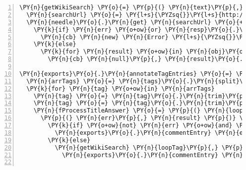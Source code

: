 \begin{Verbatim}[fontsize=\scriptsize,commandchars=\\\{\},numbers=left,firstnumber=1,stepnumber=1]
\PY{n}{getWikiSearch} \PY{o}{=} \PY{p}{(} \PY{n}{text}\PY{p}{,} \PY{n}{cb} \PY{p}{)} \PY{o}{\PYZhy{}}\PY{o}{\PYZgt{}}
  \PY{n}{searchUrl} \PY{o}{=} \PY{l+s}{\PYZsq{}}\PY{l+s}{http://en.wikipedia.org/w/api.php?format=json\PYZam{}action=query\PYZam{}list=search\PYZam{}srwhat=text\PYZam{}srlimit=3\PYZam{}srsearch=}\PY{l+s}{\PYZsq{}}
  \PY{n}{needle}\PY{o}{.}\PY{n}{get} \PY{n}{searchUrl} \PY{o}{+} \PY{n}{encodeURIComponent}\PY{p}{(} \PY{n}{text} \PY{p}{)}\PY{p}{,} \PY{p}{(} \PY{n}{err}\PY{p}{,} \PY{n}{resp}\PY{p}{,} \PY{n}{obj} \PY{p}{)} \PY{o}{\PYZhy{}}\PY{o}{\PYZgt{}}
    \PY{k}{if} \PY{n}{err} \PY{o+ow}{or} \PY{n}{resp}\PY{o}{.}\PY{n}{statusCode} \PY{n}{isnt} \PY{l+m+mi}{200} \PY{o+ow}{or} \PY{o+ow}{not} \PY{n}{obj}\PY{o}{.}\PY{n}{query} \PY{o+ow}{or} \PY{o+ow}{not} \PY{n}{obj}\PY{o}{.}\PY{n}{query}\PY{o}{.}\PY{n}{search} \PY{o+ow}{or} \PY{n}{obj}\PY{o}{.}\PY{n}{query}\PY{o}{.}\PY{n}{search}\PY{o}{.}\PY{n}{length} \PY{o+ow}{is} \PY{l+m+mi}{0}
      \PY{n}{cb} \PY{n}{new} \PY{n}{Error} \PY{l+s}{\PYZsq{}}\PY{l+s}{Nothing found}\PY{l+s}{\PYZsq{}}
    \PY{k}{else}
      \PY{k}{for} \PY{n}{result} \PY{o+ow}{in} \PY{n}{obj}\PY{o}{.}\PY{n}{query}\PY{o}{.}\PY{n}{search}
        \PY{n}{cb} \PY{n}{null}\PY{p}{,} \PY{n}{result}\PY{o}{.}\PY{n}{snippet}\PY{o}{.}\PY{n}{replace} \PY{o}{/}\PY{o}{\PYZlt{}}\PY{p}{(}\PY{err}{?}\PY{p}{:}\PY{o}{.}\PY{o}{|}\PYZbs{}\PY{n}{n}\PY{p}{)}\PY{o}{*}\PY{err}{?}\PY{o}{\PYZgt{}}\PY{o}{/}\PY{n}{gm}\PY{p}{,} \PY{l+s}{\PYZsq{}}\PY{l+s}{\PYZsq{}}

\PY{n}{exports}\PY{o}{.}\PY{n}{annotateTagEntries} \PY{o}{=} \PY{p}{(} \PY{n}{entryId}\PY{p}{,} \PY{n}{tags} \PY{p}{)} \PY{o}{\PYZhy{}}\PY{o}{\PYZgt{}}
  \PY{n}{arrTags} \PY{o}{=} \PY{n}{tags}\PY{o}{.}\PY{n}{split}\PY{p}{(} \PY{l+s}{\PYZdq{}}\PY{l+s}{\PYZsh{}}\PY{l+s}{\PYZdq{}} \PY{p}{)}\PY{o}{.}\PY{n}{slice} \PY{l+m+mi}{1}
  \PY{k}{for} \PY{n}{tag} \PY{o+ow}{in} \PY{n}{arrTags}
    \PY{n}{tag} \PY{o}{=} \PY{n}{tag}\PY{o}{.}\PY{n}{trim}\PY{p}{(}\PY{p}{)}\PY{o}{.}\PY{n}{replace} \PY{o}{/}\PYZbs{}\PYZbs{}\PY{l+s}{\PYZdq{}}\PY{l+s}{/g, }\PY{l+s}{\PYZsq{}}\PY{l+s}{\PYZsq{}}
    \PY{n}{tag} \PY{o}{=} \PY{n}{tag}\PY{o}{.}\PY{n}{trim}\PY{p}{(}\PY{p}{)}\PY{o}{.}\PY{n}{replace} \PY{o}{/}\PYZbs{}\PYZbs{}\PY{o}{/}\PY{n}{g}\PY{p}{,} \PY{l+s}{\PYZsq{}}\PY{l+s}{\PYZsq{}}
    \PY{n}{fProcessTitleAnswer} \PY{o}{=} \PY{p}{(} \PY{n}{loopTag} \PY{p}{)} \PY{o}{\PYZhy{}}\PY{o}{\PYZgt{}} 
      \PY{p}{(} \PY{n}{err}\PY{p}{,} \PY{n}{result} \PY{p}{)} \PY{o}{\PYZhy{}}\PY{o}{\PYZgt{}}
        \PY{k}{if} \PY{o+ow}{not} \PY{n}{err} \PY{o+ow}{and} \PY{n}{result}
          \PY{n}{exports}\PY{o}{.}\PY{n}{commentEntry} \PY{n}{entryId}\PY{p}{,} \PY{n}{result}
        \PY{k}{else}
          \PY{n}{getWikiSearch} \PY{n}{loopTag}\PY{p}{,} \PY{p}{(} \PY{n}{err}\PY{p}{,} \PY{n}{result} \PY{p}{)} \PY{o}{\PYZhy{}}\PY{o}{\PYZgt{}}
            \PY{n}{exports}\PY{o}{.}\PY{n}{commentEntry} \PY{n}{entryId}\PY{p}{,} \PY{n}{result}


\end{Verbatim}
